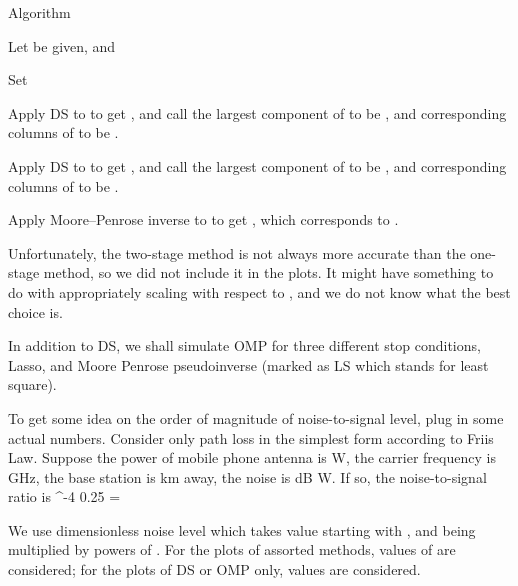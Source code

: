 \Result
{Algorithm}
{
\startitemize[n]
\item Let  be given, and 

\item Set

\item Apply DS to  to get , and call the  largest component of  to be , and corresponding columns of  to be .

\item Apply DS to  to get , and call the  largest component of  to be , and corresponding columns of  to be .

\item Apply Moore–Penrose inverse to  to get , which corresponds to .
\stopitemize
}

Unfortunately, the two-stage method is not always more accurate than the one-stage method, so we did not include it in the plots.
It might have something to do with appropriately scaling  with respect to , and we do not know what the best choice is.

\stopsubsection

\startsection [title={Result}]

\startsubsection [title={Settings}]

In addition to DS, we shall simulate OMP for three different stop conditions, Lasso, and Moore Penrose pseudoinverse (marked as LS which stands for least square).

To get some idea on the order of magnitude of noise-to-signal level, plug in some actual numbers.
Consider only path loss in the simplest form according to Friis Law.
Suppose the power of mobile phone antenna is  W,
the carrier frequency is  GHz,
the base station is  km away,
the noise is  dB W.
If so, the noise-to-signal ratio is
 {
^{-4}  {0.25} 
= \NR
}

We use dimensionless noise level \m {\s} which takes value starting with , and being multiplied by powers of .
For the plots of assorted methods,  values of \m {\s} are considered; for the plots of DS or OMP only,  values are considered.


